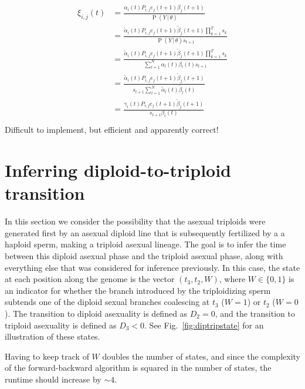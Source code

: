 \documentclass{article}
\DeclareMathOperator{\Prob}{P}
\begin{document}
\begin{align}
    \begin{split}
        \xi_{i,j}(t) &= 
                 \frac{\alpha_i(t)P_{i,j}e_j(t+1)\beta_j(t+1)}
                 {\Prob(Y\,|\,\theta)} \\
                 &= 
                 \frac{\tilde{\alpha}_i(t)P_{i,j}e_j(t+1)\tilde{\beta}_j(t+1)\prod_{k=1}^Ts_k}
                 {\Prob(Y\,|\,\theta)s_{t+1}} \\
                 &= 
                 \frac{\tilde{\alpha}_i(t)P_{i,j}e_j(t+1)\tilde{\beta}_j(t+1)\prod_{k=1}^Ts_k}
                 {\sum_{l=1}^N\alpha_l(t)\beta_l(t)s_{t+1}} \\
                 &= 
                 \frac{\tilde{\alpha}_i(t)P_{i,j}e_j(t+1)\tilde{\beta}_j(t+1)}
                 {s_{t+1}\sum_{l=1}^N\tilde{\alpha}_l(t)\tilde{\beta}_l(t)} \\
                 &= 
                 \frac{\gamma_i(t)P_{i,j}e_j(t+1)\tilde{\beta}_j(t+1)}
                 {s_{t+1}\beta_i(t)} \\
    \end{split}
\end{align}
Difficult to implement, but efficient and apparently correct!

\section{Inferring diploid-to-triploid transition}

In this section we consider the possibility that the asexual triploids were
generated first by an asexual diploid line that is subsequently fertilized by a
a haploid sperm, making a triploid asexual lineage. The goal is to infer the
time between this diploid asexual phase and the triploid asexual phase, along
with everything else that was considered for inference previously. In this
case, the state at each position along the genome is the vector $(t_3, t_2,
W)$, where $W \in \{0,1\}$ is an indicator for whether the branch introduced by
the triploidizing sperm subtends one of the diploid sexual branches coalescing
at $t_3$ ($W = 1$) or $t_2$ ($W = 0$). The transition to diploid asexuality is
defined as $D_2 = 0$, and the transition to triploid asexuality is defined as
$D_3 < 0$. See Fig.\ \ref{fig:diptripstate} for an illustration of these
states.

Having to keep track of $W$ doubles the number of states, and since the
complexity of the forward-backward algorithm is squared in the number of
states, the runtime should increase by $\sim 4$.
\end{document}

